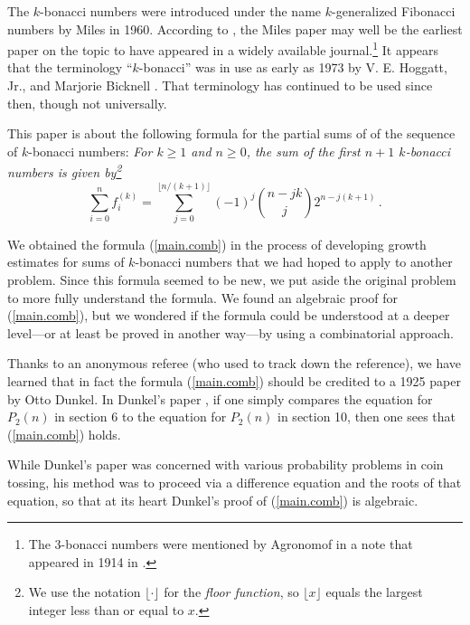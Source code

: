 \documentclass[11pt,reqno]{amsart}
\theoremstyle{plain}
\numberwithin{equation}{section}
\begin{document}
The $k$-bonacci numbers were introduced under the name $k$-generalized Fibonacci numbers by  Miles   \cite{10.2307/2308649} in 1960.
According to \cite{Kessler:2004:CPG}, the Miles paper may well be the earliest paper 
on the topic to have appeared in a widely available journal.\footnote{The 
$3$-bonacci numbers  were mentioned by Agronomof  in a note that appeared in 1914 in \cite{Agronomof}.}
It appears that the terminology 
``$k$-bonacci'' was in use as early as 1973 by V. E. Hoggatt, Jr., and Marjorie Bicknell \cite{Bicknell:1973:GFP}. That terminology has continued to be used since then, though not universally.

This paper is about the following formula for the partial sums   of 
of  the sequence of $k$-bonacci numbers:
{\sl For $k\geq 1$ and $n\geq 0$, the 
sum of the first $n+1$ $k$-bonacci numbers
is given by\footnote{We  use  the notation 
$\lfloor \cdot \rfloor$ for the {\em floor function}, so $\lfloor x \rfloor$ equals the largest integer less than or equal to $x$.} }
\begin{equation}\label{main.comb}
\sum_{i=0}^{n} f_{i}^{(k)} = \sum_{j=0}^{\lfloor n/(k+1) \rfloor} (-1)^{j} \binom{n-jk}{j}2^{n-j(k+1)} 
\,.
\end{equation}

We obtained the formula (\ref{main.comb})  in the process of developing growth 
estimates for   sums of $k$-bonacci numbers
that we had hoped to apply to another problem. 
Since this formula seemed to be new,
we put aside the original problem to more fully understand the formula.
We found an algebraic proof for  (\ref{main.comb}), 
but we wondered if the formula could be understood 
at a deeper level---or at least be proved in another way---by  
using a  combinatorial approach.

Thanks to an anonymous referee 
(who used 
\cite{oeis_A172119} to track down the reference), we have learned 
that in fact
the formula  (\ref{main.comb}) should be credited to a 1925 paper by
Otto Dunkel.  
In Dunkel's paper  \cite{dunkel1925solutions}, if one simply compares
the equation for $P_2(n)$ in section 6 to the equation for $P_2(n)$ in section
10, then one sees  that  (\ref{main.comb})  holds.

While Dunkel's paper was concerned with various probability problems in coin tossing,
his method was to proceed via a difference equation and the roots of that
equation, so that 
at its heart Dunkel's  proof of (\ref{main.comb}) is algebraic.
\end{document}
